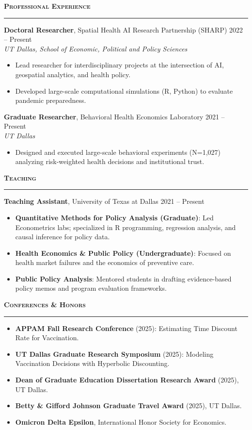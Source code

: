\documentclass[11pt, letterpaper]{article}
\newcommand{\ressection}[1]{
    \vspace{10pt}
    \noindent\textbf{\large \textsc{#1}}
    \vspace{-2pt}
    \hrule
    \vspace{5pt}
}
\begin{document}
\ressection{Professional Experience}
\noindent \textbf{Doctoral Researcher}, Spatial Health AI Research Partnership (SHARP) \hfill 2022 -- Present \\
\textit{UT Dallas, School of Economic, Political and Policy Sciences}
\begin{itemize}
    \item Lead researcher for interdisciplinary projects at the intersection of AI, geospatial analytics, and health policy.
    \item Developed large-scale computational simulations (R, Python) to evaluate pandemic preparedness.
\end{itemize}

\vspace{0.4em}
\noindent \textbf{Graduate Researcher}, Behavioral Health Economics Laboratory \hfill 2021 -- Present \\
\textit{UT Dallas}
\begin{itemize}
    \item Designed and executed large-scale behavioral experiments (N=1,027) analyzing risk-weighted health decisions and institutional trust.
\end{itemize}

\ressection{Teaching}
\noindent \textbf{Teaching Assistant}, University of Texas at Dallas \hfill 2021 -- Present
\begin{itemize}
    \item \textbf{Quantitative Methods for Policy Analysis (Graduate)}: Led Econometrics labs; specialized in R programming, regression analysis, and causal inference for policy data.
    \item \textbf{Health Economics \& Public Policy (Undergraduate)}: Focused on health market failures and the economics of preventive care.
    \item \textbf{Public Policy Analysis}: Mentored students in drafting evidence-based policy memos and program evaluation frameworks.
\end{itemize}

\ressection{Conferences \& Honors}
\begin{itemize}
    \item \textbf{APPAM Fall Research Conference} (2025): Estimating Time Discount Rate for Vaccination.
    \item \textbf{UT Dallas Graduate Research Symposium} (2025): Modeling Vaccination Decisions with Hyperbolic Discounting.
    \item \textbf{Dean of Graduate Education Dissertation Research Award} (2025), UT Dallas.
    \item \textbf{Betty \& Gifford Johnson Graduate Travel Award} (2025), UT Dallas.
    \item \textbf{Omicron Delta Epsilon}, International Honor Society for Economics.
\end{itemize}
\end{document}

